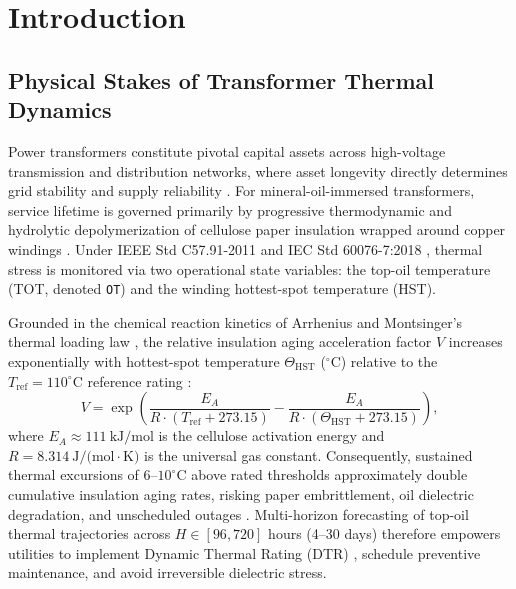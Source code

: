 \documentclass[pdflatex,sn-mathphys-num,referee,lineno]{sn-jnl}
\theoremstyle{thmstyleone}
\theoremstyle{thmstyletwo}
\theoremstyle{thmstylethree}
\begin{document}

\maketitle

\section{Introduction}\label{sec:introduction}

\subsection{Physical Stakes of Transformer Thermal Dynamics}\label{subsec:physical_stakes}
Power transformers constitute pivotal capital assets across high-voltage transmission and distribution networks, where asset longevity directly determines grid stability and supply reliability \cite{alvarez2019transformer, tang2004simplified, ieee2024c57165}. For mineral-oil-immersed transformers, service lifetime is governed primarily by progressive thermodynamic and hydrolytic depolymerization of cellulose paper insulation wrapped around copper windings \cite{susa2005dynamic, pradhan2003hst}. Under IEEE Std C57.91-2011 \cite{ieee2012c5791} and IEC Std 60076-7:2018 \cite{iec2018600767}, thermal stress is monitored via two operational state variables: the top-oil temperature (TOT, denoted \texttt{OT}) and the winding hottest-spot temperature (HST).

Grounded in the chemical reaction kinetics of Arrhenius \cite{arrhenius1889geschwindigkeit} and Montsinger's thermal loading law \cite{montsinger1930loading}, the relative insulation aging acceleration factor $V$ increases exponentially with hottest-spot temperature $\Theta_{\mathrm{HST}}$ ($^\circ\mathrm{C}$) relative to the $T_{\mathrm{ref}} = 110^\circ\mathrm{C}$ reference rating \cite{ieee2012c5791}:
\begin{equation}
V = \exp \left( \frac{E_A}{R \cdot (T_{\mathrm{ref}} + 273.15)} - \frac{E_A}{R \cdot (\Theta_{\mathrm{HST}} + 273.15)} \right),
\label{eq:arrhenius_aging}
\end{equation}
where $E_A \approx 111~\text{kJ/mol}$ is the cellulose activation energy and $R = 8.314~\text{J/(mol}\cdot\text{K)}$ is the universal gas constant. Consequently, sustained thermal excursions of $6$--$10^\circ\mathrm{C}$ above rated thresholds approximately double cumulative insulation aging rates, risking paper embrittlement, oil dielectric degradation, and unscheduled outages \cite{swift2001fundamental, radakovic2003hotspot}. Multi-horizon forecasting of top-oil thermal trajectories across $H \in [96, 720]$ hours (4--30 days) therefore empowers utilities to implement Dynamic Thermal Rating (DTR) \cite{alvarez2019transformer}, schedule preventive maintenance, and avoid irreversible dielectric stress.
\end{document}
